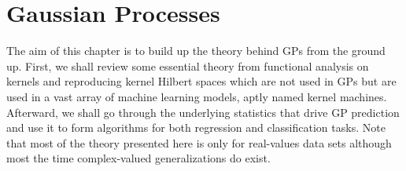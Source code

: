 \section{Gaussian Processes}\label{Chapter1}
The aim of this chapter is to build up the theory behind GPs from the ground up. First, we shall review some essential theory from functional analysis on kernels and reproducing kernel Hilbert spaces which are not used in GPs but are used in a vast array of machine learning models, aptly named kernel machines. Afterward, we shall go through the underlying statistics that drive GP prediction and use it to form algorithms for both regression and classification tasks. Note that most of the theory presented here is only for real-values data sets although most the time complex-valued generalizations do exist.











